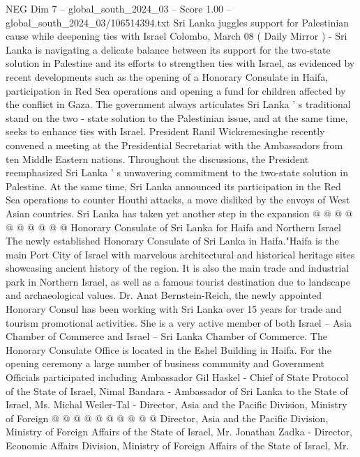 \begin{textsample}{NEG Dim 7 – global\_south\_2024\_03 – Score 1.00 – global\_south\_2024\_03/106514394.txt}  \label{ex:f7_neg_298}
Sri Lanka juggles support for Palestinian cause while deepening ties with Israel Colombo, March 08 ( Daily Mirror ) - Sri Lanka is navigating a delicate balance between its support for the two-state solution in Palestine and its efforts to strengthen ties with Israel, as evidenced by recent developments such as the opening of a Honorary Consulate in Haifa, participation in Red Sea operations and opening a fund for children affected by the conflict in Gaza.
The government always articulates Sri Lanka ' s traditional stand on the two - state solution to the Palestinian issue, and at the same time, seeks to enhance ties with Israel.
President Ranil Wickremesinghe recently convened a meeting at the Presidential Secretariat with the Ambassadors from ten Middle Eastern nations.
Throughout the discussions, the President reemphasized Sri Lanka ' s unwavering commitment to the two-state solution in Palestine.
At the same time, Sri Lanka announced its participation in the Red Sea operations to counter Houthi attacks, a move disliked by the envoys of West Asian countries.
Sri Lanka has taken yet another step in the expansion @ @ @ @ @ @ @ @ @ @ Honorary Consulate of Sri Lanka for Haifa and Northern Israel The newly established Honorary Consulate of Sri Lanka in Haifa."Haifa is the main Port City of Israel with marvelous architectural and historical heritage sites showcasing ancient history of the region.
It is also the main trade and industrial park in Northern Israel, as well as a famous tourist destination due to landscape and archaeological values.
Dr.
Anat Bernstein-Reich, the newly appointed Honorary Consul has been working with Sri Lanka over 15 years for trade and tourism promotional activities.
She is a very active member of both Israel -- Asia Chamber of Commerce and Israel -- Sri Lanka Chamber of Commerce.
The Honorary Consulate Office is located in the Eshel Building in Haifa.
For the opening ceremony a large number of business community and Government Officials participated including Ambassador Gil Haskel - Chief of State Protocol of the State of Israel, Nimal Bandara - Ambassador of Sri Lanka to the State of Israel, Ms.
Michal Weiler-Tal - Director, Asia and the Pacific Division, Ministry of Foreign @ @ @ @ @ @ @ @ @ @ Director, Asia and the Pacific Division, Ministry of Foreign Affairs of the State of Israel, Mr.
Jonathan Zadka - Director, Economic Affairs Division, Ministry of Foreign Affairs of the State of Israel, Mr.

\end{textsample}

